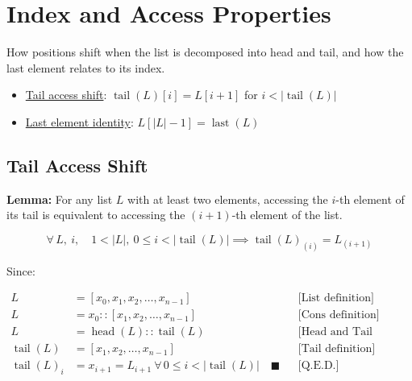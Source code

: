\section{Index and Access Properties}
\label{sec:index-access}

How positions shift when the list is decomposed into head and tail, and
how the last element relates to its index.

\begin{itemize}
  \item \href{https://github.com/thiagomata/prime-numbers/blob/list-article-v1.0.0/src/main/scala/v1/chapter3/list/properties/ListUtilsProperties.scala}{Tail access shift}:
    $\operatorname{tail}(L)[i] = L[i+1]$ for $i < |\operatorname{tail}(L)|$
  \item \href{https://github.com/thiagomata/prime-numbers/blob/list-article-v1.0.0/src/main/scala/v1/chapter3/list/properties/ListUtilsProperties.scala}{Last element identity}:
    $L[|L|-1] = \operatorname{last}(L)$
\end{itemize}

\subsection{Tail Access Shift}

\textbf{Lemma:} For any list $L$ with at least two elements, accessing
the $i$-th element of its tail is equivalent to accessing the $(i + 1)$-th
element of the list.

\begin{equation*}
\forall\, L,\ i,\quad 1 < |L|,\ 0 \le i < |\operatorname{tail}(L)| \implies \operatorname{tail}(L)_{(i)} = L_{(i + 1)}
\end{equation*}

Since:\par\nopagebreak

\begin{equation*}
\begin{aligned}
L &= [x_0, x_1, x_2, \dots, x_{n - 1}] && \text{[List definition]} \\
L &= x_0 :: [x_1, x_2, \dots, x_{n - 1}] && \text{[Cons definition]} \\
L &= \operatorname{head}(L) :: \operatorname{tail}(L) && \text{[Head and Tail definition]} \\
\operatorname{tail}(L) &= [x_1, x_2, \dots, x_{n - 1}] && \text{[Tail definition]} \\
\operatorname{tail}(L)_i &= x_{i + 1} = L_{i + 1} \ \forall\, 0 \le i < |\operatorname{tail}(L)| \quad \blacksquare && \text{[Q.E.D.]} \\
\end{aligned}
\end{equation*}

